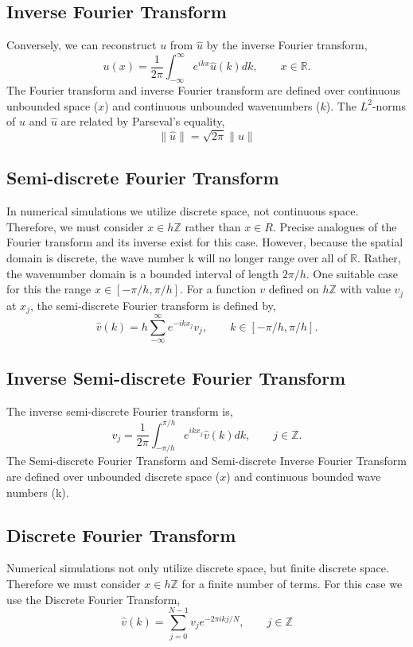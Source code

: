 \documentclass[12pt]{article}
\begin{document}
\begin{flushleft}
\subsection{Inverse Fourier Transform}
Conversely, we can reconstruct $u$ from $\hat{u}$ by the inverse Fourier transform,
$$u(x) = \frac{1}{2\pi}\int_{-\infty}^{\infty}e^{ikx}\hat{u}(k)dk, \qquad x\in\mathbb{R}.$$
The Fourier transform and inverse Fourier transform are defined over continuous unbounded space ($x$) and continuous unbounded wavenumbers ($k$). The $L^2$-norms of $u$ and $\hat{u}$ are related by Parseval's equality,
$$\|\hat{u}\| = \sqrt{2\pi}\|u\|$$

\subsection{Semi-discrete Fourier Transform}
\qquad In numerical simulations we utilize discrete space, not continuous space. Therefore, we must consider $x \in h\mathbb{Z}$ rather than $x\in R$. Precise analogues of the Fourier transform and its inverse exist for this case. However, because the spatial domain is discrete, the wave number k will no longer range over all of $\mathbb{R}$. Rather, the wavenumber domain is a bounded interval of length $2\pi/h$. One suitable case for this the range $x\in [-\pi/h,\pi/h]$. For a function $v$ defined on $h\mathbb{Z}$ with value $v_j$ at $x_j$, the semi-discrete Fourier transform is defined by,
$$\hat{v}(k) = h\sum_{-\infty}^{\infty}e^{-ikx_j}v_j, \qquad k\in [-\pi/h,\pi/h].$$

\subsection{Inverse Semi-discrete Fourier Transform}
The inverse semi-discrete Fourier transform is,
$$v_j = \frac{1}{2\pi}\int_{-\pi/h}^{\pi/h}e^{ikx_j}\hat{v}(k)dk, \qquad j\in\mathbb{Z}.$$
The Semi-discrete Fourier Transform and Semi-discrete Inverse Fourier Transform are defined over unbounded discrete space ($x$) and continuous bounded wave numbers (k).

\subsection{Discrete Fourier Transform}

\qquad Numerical simulations not only utilize discrete space, but finite discrete space. Therefore we must consider $x\in h\mathbb{Z}$ for a finite number of terms. For this case we use the Discrete Fourier Transform,
$$\hat{v}(k) = \sum_{j=0}^{N-1}v_j e^{-2\pi i k j/N}, \qquad j\in\mathbb{Z}$$


\end{flushleft}
\end{document}
